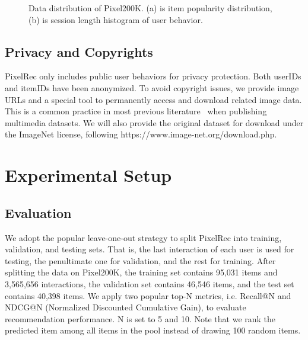 \documentclass[sigconf]{acmart}
\begin{document}
	\begin{figure}[t]
		\centering
		\caption{Data distribution of Pixel200K. (a) is item popularity distribution,  (b) is session length histogram of user behavior. }
		\label{fig:distfigure}
	\end{figure}
	

\subsection{Privacy and Copyrights}
PixelRec only includes public user behaviors for privacy protection. Both userIDs and itemIDs have been anonymized.
To avoid copyright issues, we provide image URLs and  a special tool to permanently  access and download related image data. This is a common practice in most previous literature~\cite{zeng2022tencent,nielsen2022mumin}
when publishing multimedia datasets.
We will also provide the original dataset for download under the ImageNet license, following https://www.image-net.org/download.php.


\section{Experimental Setup}
\subsection{Evaluation}
We adopt the popular leave-one-out strategy to split PixelRec into training, validation, and testing sets. That is, the last interaction of each user is used for testing, the penultimate one for validation, and the rest for training. After  splitting the data on Pixel200K, the training set contains 95,031 items and 3,565,656 interactions, the validation set contains 46,546 items, and the test set contains 40,398 items. 
We apply two popular top-N metrics, i.e. Recall@N and NDCG@N (Normalized Discounted Cumulative Gain), to  evaluate recommendation performance. 
N is set to 5 and 10. Note that  we rank
the predicted item among all items in the pool instead of
drawing 100 random items. 
\end{document}
